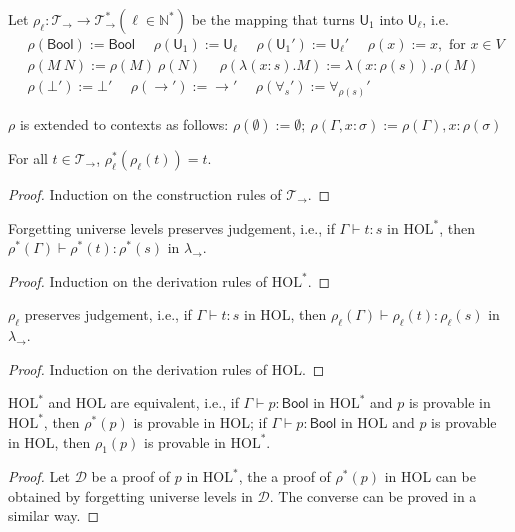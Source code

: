   \begin{definition}
    Let $\rho_\ell : \mathcal{T}_\to \to \mathcal{T}_\to^*(\ell \in \mathbb{N}^*)$ be the mapping that turns $\mathsf{U}_1$ into $\mathsf{U}_\ell$, i.e.
    $$\begin{aligned}
    & \rho(\mathsf{Bool}) := \mathsf{Bool} \ \ \ \ \ \ \rho(\mathsf{U}_1) := \mathsf{U}_\ell \ \ \ \ \ \
      \rho(\mathsf{U}_1') := \mathsf{U}_\ell' \ \ \ \ \ \ \rho(x) := x, \text{ for }x \in V \\
    & \rho(M \ N) := \rho(M) \ \rho(N) \ \ \ \ \ \ \rho(\lambda (x : s). M) := \lambda (x : \rho(s)). \rho(M) \\
    & \rho(\bot') := \bot' \ \ \ \ \ \ \rho(\to') := \to' \ \ \ \ \ \ \rho(\forall_s') := \forall_{\rho(s)}'
    \end{aligned}$$

    \noindent $\rho$ is extended to contexts as follows: $\rho(\emptyset) := \emptyset; \ \rho(\Gamma, x : \sigma) := \rho(\Gamma), x : \rho(\sigma)$
  \end{definition}

  \begin{theorem}
    For all $t \in \mathcal{T}_\to$, $\rho_\ell^*(\rho_\ell(t)) = t$.
    \begin{proof} Induction on the construction rules of $\mathcal{T}_\to$. \end{proof}
  \end{theorem}

  \begin{theorem}
    Forgetting universe levels preserves judgement, i.e., if $\Gamma \vdash t : s$ in $\text{HOL}^*$,
    then $\rho^*(\Gamma) \vdash \rho^*(t) : \rho^*(s)$ in $\lambda_\to$.
    \begin{proof} Induction on the derivation rules of $\text{HOL}^*$. \end{proof}
  \end{theorem}

  \begin{theorem}
    $\rho_\ell$ preserves judgement, i.e., if $\Gamma \vdash t : s$ in HOL, then
    $\rho_\ell(\Gamma) \vdash \rho_\ell(t) : \rho_\ell(s)$ in $\lambda_\to$.
    \begin{proof} Induction on the derivation rules of HOL. \end{proof}
  \end{theorem}

  \begin{theorem}
    $\text{HOL}^*$ and HOL are equivalent, i.e., if $\Gamma \vdash p : \mathsf{Bool}$ in $\text{HOL}^*$
    and $p$ is provable in $\text{HOL}^*$, then $\rho^*(p)$ is provable in HOL; if $\Gamma \vdash p : \mathsf{Bool}$
    in HOL and $p$ is provable in HOL, then $\rho_1(p)$ is provable in $\text{HOL}^*$.
    \begin{proof}
      Let $\mathcal{D}$ be a proof of $p$ in $\text{HOL}^*$, the a proof of
      $\rho^*(p)$ in HOL can be obtained by forgetting universe levels in $\mathcal{D}$.
      The converse can be proved in a similar way.
    \end{proof}
  \end{theorem}

